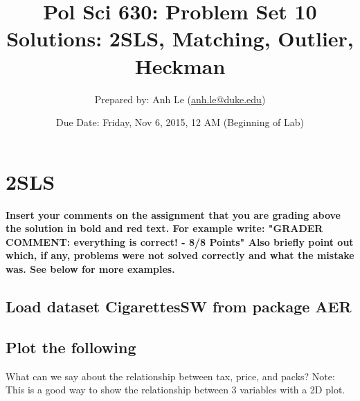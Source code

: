 \documentclass{article}
\begin{document}
\title{Pol Sci 630:  Problem Set 10 Solutions: 2SLS, Matching, Outlier, Heckman}

\author{Prepared by: Anh Le (\href{mailto:anh.le@duke.edu}{anh.le@duke.edu})}

\date{Due Date: Friday, Nov 6, 2015, 12 AM (Beginning of Lab)}

\maketitle

\section{2SLS}

\textbf{\color{red} Insert your comments on the assignment that you are grading above the solution in bold and red text. For example write: "GRADER COMMENT: everything is correct! - 8/8 Points" Also briefly point out which, if any, problems were not solved correctly and what the mistake was. See below for more examples.}

\subsection{Load dataset CigarettesSW from package AER}

\begin{knitrout}
\color{fgcolor}\begin{kframe}
\begin{alltt}
\hlstd{(}\hlstd{)}
\end{alltt}
\end{kframe}
\end{knitrout}

\subsection{Plot the following}

What can we say about the relationship between tax, price, and packs? Note: This is a good way to show the relationship between 3 variables with a 2D plot.
\end{document}
